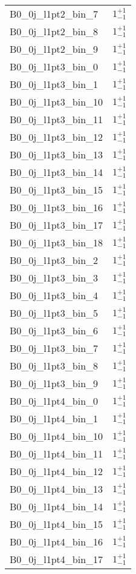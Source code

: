 \begin{tabular}{|l|c|}
B0\_0j\_l1pt2\_bin\_7 & $1^{+1}_{-1}$ \\
B0\_0j\_l1pt2\_bin\_8 & $1^{+1}_{-1}$ \\
B0\_0j\_l1pt2\_bin\_9 & $1^{+1}_{-1}$ \\
B0\_0j\_l1pt3\_bin\_0 & $1^{+1}_{-1}$ \\
B0\_0j\_l1pt3\_bin\_1 & $1^{+1}_{-1}$ \\
B0\_0j\_l1pt3\_bin\_10 & $1^{+1}_{-1}$ \\
B0\_0j\_l1pt3\_bin\_11 & $1^{+1}_{-1}$ \\
B0\_0j\_l1pt3\_bin\_12 & $1^{+1}_{-1}$ \\
B0\_0j\_l1pt3\_bin\_13 & $1^{+1}_{-1}$ \\
B0\_0j\_l1pt3\_bin\_14 & $1^{+1}_{-1}$ \\
B0\_0j\_l1pt3\_bin\_15 & $1^{+1}_{-1}$ \\
B0\_0j\_l1pt3\_bin\_16 & $1^{+1}_{-1}$ \\
B0\_0j\_l1pt3\_bin\_17 & $1^{+1}_{-1}$ \\
B0\_0j\_l1pt3\_bin\_18 & $1^{+1}_{-1}$ \\
B0\_0j\_l1pt3\_bin\_2 & $1^{+1}_{-1}$ \\
B0\_0j\_l1pt3\_bin\_3 & $1^{+1}_{-1}$ \\
B0\_0j\_l1pt3\_bin\_4 & $1^{+1}_{-1}$ \\
B0\_0j\_l1pt3\_bin\_5 & $1^{+1}_{-1}$ \\
B0\_0j\_l1pt3\_bin\_6 & $1^{+1}_{-1}$ \\
B0\_0j\_l1pt3\_bin\_7 & $1^{+1}_{-1}$ \\
B0\_0j\_l1pt3\_bin\_8 & $1^{+1}_{-1}$ \\
B0\_0j\_l1pt3\_bin\_9 & $1^{+1}_{-1}$ \\
B0\_0j\_l1pt4\_bin\_0 & $1^{+1}_{-1}$ \\
B0\_0j\_l1pt4\_bin\_1 & $1^{+1}_{-1}$ \\
B0\_0j\_l1pt4\_bin\_10 & $1^{+1}_{-1}$ \\
B0\_0j\_l1pt4\_bin\_11 & $1^{+1}_{-1}$ \\
B0\_0j\_l1pt4\_bin\_12 & $1^{+1}_{-1}$ \\
B0\_0j\_l1pt4\_bin\_13 & $1^{+1}_{-1}$ \\
B0\_0j\_l1pt4\_bin\_14 & $1^{+1}_{-1}$ \\
B0\_0j\_l1pt4\_bin\_15 & $1^{+1}_{-1}$ \\
B0\_0j\_l1pt4\_bin\_16 & $1^{+1}_{-1}$ \\
B0\_0j\_l1pt4\_bin\_17 & $1^{+1}_{-1}$ \\

\end{tabular}
